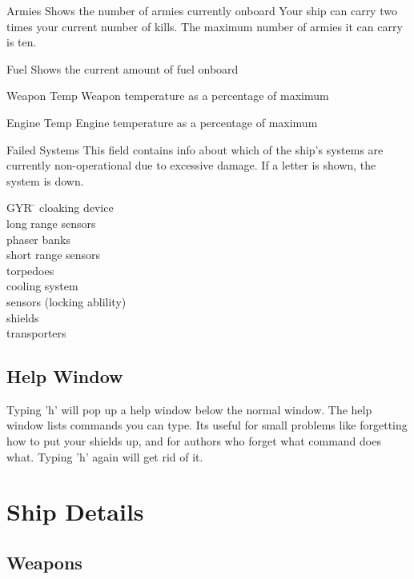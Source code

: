 \begin{list}{}{
	\renewcommand{\makelabel}[1]{{\tt #1 \hfill}}
         \setlength{\leftmargin}{2.75cm}
         \setlength{\labelwidth}{\leftmargin}
         \setlength{\labelsep}{0in}
}
\item[Armies] Shows the number of armies currently onboard
Your ship can carry two times your current number of kills.
The maximum number of armies it can carry is ten.

\item[Fuel] Shows the current amount of fuel onboard

\item[Weapon Temp] Weapon temperature as a percentage of maximum

\item[Engine Temp] Engine temperature as a percentage of maximum

\item[Failed Systems]
	This field contains info about which of the ship's systems are currently
	non-operational due to excessive damage.  If a letter is shown, 
        the system is down.

	\begin{tabbing}
        GYR \= \kill
	 \> cloaking device \\
	 \> long range sensors \\
	 \> phaser banks \\
	 \> short range sensors  \\
	 \> torpedoes \\
	 \> cooling system \\
	 \> sensors (locking ablility) \\
	 \> shields \\
	 \> transporters \\
	\end{tabbing}
\end{list}


\subsection{Help Window}

Typing 'h' will pop up a help window below the normal window.  The help
window lists commands you can type.  Its useful for small problems
like forgetting how to put your shields up, and for authors who forget
what command does what.  Typing 'h' again will get rid of it.

\section{Ship Details}

\subsection{Weapons}

